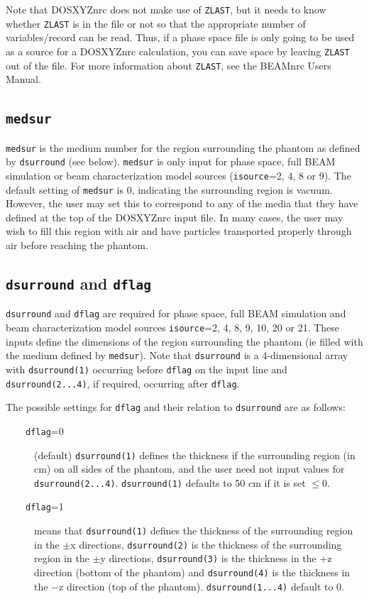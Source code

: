 \documentclass[12pt,twoside]{article}      %
\newcommand{\indexm}[1]{\index{#1}}
\begin{document}
Note that DOSXYZnrc does not make use of {\tt ZLAST}, but it needs to know
whether {\tt ZLAST} is in the file or not so that the appropriate number
of variables/record can be read.  Thus, if a phase space file is only
going to be used as a source for a DOSXYZnrc calculation, you can save space
by leaving {\tt ZLAST} out of the file.  For more information
about {\tt ZLAST}, see the BEAMnrc Users Manual\cite{Ro09}.

\subsection {{\tt medsur}}
\indexm{medsur}
{\tt medsur} is the medium number for the region surrounding the phantom
as defined by {\tt dsurround}
(see below).  {\tt medsur} is only input for phase space, full BEAM
simulation or beam characterization
model sources ({\tt isource}=2, 4, 8 or 9).  The default setting of {\tt medsur}
is 0, indicating the
surrounding region is vacuum.  However, the user may set this to correspond
to any of the media that they have defined at the top of the DOSXYZnrc input file.
In many cases, the user may wish to fill this region with air and have particles
transported properly through air before reaching the phantom.

\subsection{{\tt dsurround} and {\tt dflag}}
\label{dflagsect}
\indexm{dsurround}
\indexm{dflag}

{\tt dsurround} and {\tt dflag} are required for phase space, full
BEAM simulation and
beam characterization model sources {\tt isource}=2, 4, 8, 9, 10, 20 or 21.
These inputs define the dimensions of the region surrounding the phantom
(ie filled with the medium defined by {\tt medsur}).  Note that
{\tt dsurround} is a 4-dimensional array
with {\tt dsurround(1)} occurring before {\tt dflag} on the input line
and {\tt dsurround(2...4)}, if required, occurring after {\tt dflag}.

The possible settings for {\tt dflag} and their relation to {\tt dsurround}
are as follows:

\begin{description}

\item [~~~~{\tt dflag}=0] (default) {\tt dsurround(1)} defines the thickness
if the surrounding region (in cm) on all sides of the phantom, and the user
need not
input values for {\tt dsurround(2...4)}.  {\tt dsurround(1)}
defaults to 50 cm if it is set $\leq$0.
\item [~~~~{\tt dflag}=1] means that {\tt dsurround(1)} defines the thickness of the
surrounding region in the $\pm$x directions, {\tt dsurround(2)} is the
thickness of the surrounding region in the $\pm$y directions, {\tt dsurround(3)}
is the thickness in the +z direction (bottom of the phantom)
and {\tt dsurround(4)} is the thickness
in the $-$z direction (top of the phantom).  {\tt dsurround(1...4)} default to 0.
\end{description}
\end{document}
